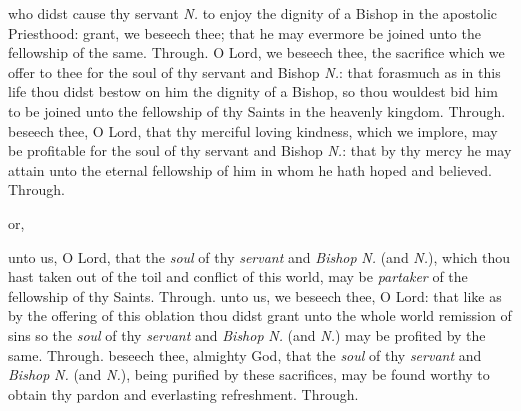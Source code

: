 \begin{multicols}{2}
 who didst cause thy servant \textit{N.} to enjoy the dignity of a Bishop in the apostolic Priesthood: grant, we beseech thee; that he may evermore be joined unto the fellowship of the same. Through.
 O Lord, we beseech thee, the sacrifice which we offer to thee for the soul of thy servant and Bishop \textit{N.}: that forasmuch as in this life thou didst bestow on him the dignity of a Bishop, so thou wouldest bid him to be joined unto the fellowship of thy Saints in the heavenly kingdom. Through.
 beseech thee, O Lord, that thy merciful loving kindness, which we implore, may be profitable for the soul of thy servant and Bishop \textit{N.}: that by thy mercy he may attain unto the eternal fellowship of him in whom he hath hoped and believed. Through.
\begin{inhead}
or,
\end{inhead}
\vspace{-1\baselineskip}
 unto us, O Lord, that the \textit{soul} of thy \textit{servant} and \textit{Bishop} \textit{N.} (and \textit{N.}), which thou hast taken out of the toil and conflict of this world, may be \textit{partaker} of the fellowship of thy Saints. Through.
 unto us, we beseech thee, O Lord: that like as by the offering of this oblation thou didst grant unto the whole world remission of sins so the \textit{soul} of thy \textit{servant} and \textit{Bishop} \textit{N.} (and \textit{N.}) may be profited by the same. Through.
 beseech thee, almighty God, that the \textit{soul} of thy \textit{servant} and \textit{Bishop} \textit{N.} (and \textit{N.}), being purified by these sacrifices, may be found worthy to obtain thy pardon and everlasting refreshment. Through.


\end{multicols}
